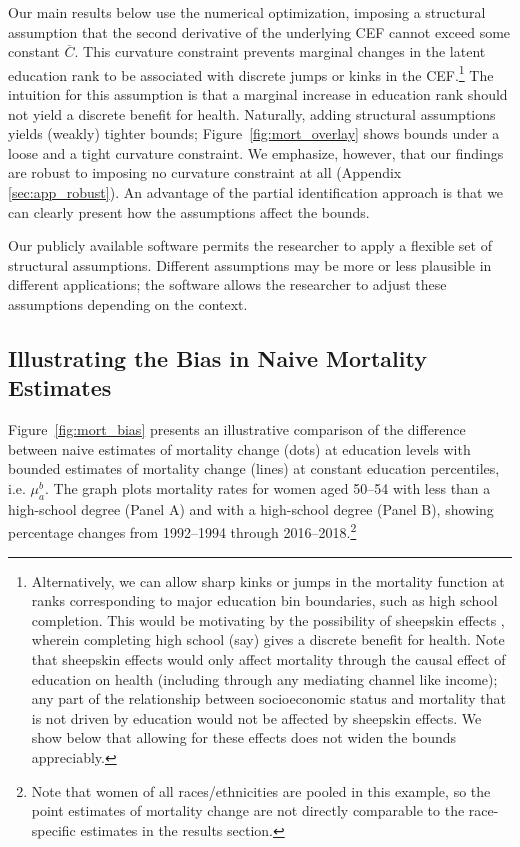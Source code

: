 \documentclass[12pt,letterpaper]{article}
\numberwithin{equation}{section}
\begin{document}
Our main results below use the numerical optimization, imposing a structural assumption that the second derivative of the underlying CEF cannot exceed some constant $\overline{C}$. This curvature constraint prevents marginal changes in the latent education rank to be associated with discrete jumps or kinks in the CEF.\footnote{Alternatively, we can allow sharp kinks or jumps in the mortality function at ranks corresponding to major education bin boundaries, such as high school completion. This would be motivating by the possibility of sheepskin effects \citep{hungerford1987}, wherein completing high school (say) gives a discrete benefit for health. Note that sheepskin effects would only affect mortality through the causal effect of education on health (including through any mediating channel like income); any part of the relationship between socioeconomic status and mortality that is not driven by education would not be affected by sheepskin effects. We show below that allowing for these effects does not widen the bounds appreciably.}  The intuition for this assumption is that a marginal increase in education rank should not yield a discrete benefit for health. Naturally, adding structural assumptions yields (weakly) tighter bounds; Figure~\ref{fig:mort_overlay} shows bounds under a loose and a tight curvature constraint. We emphasize, however, that our findings are robust to imposing no curvature constraint at all (Appendix \ref{sec:app_robust}). An advantage of the partial identification approach is that we can clearly present how the assumptions affect the bounds.

Our publicly available software permits the researcher to apply a flexible set of structural assumptions. Different assumptions may be more or less plausible in different applications; the software allows the researcher to adjust these assumptions depending on the context.

\subsection{Illustrating the Bias in Naive Mortality Estimates} 
\label{sec:bias}

Figure~\ref{fig:mort_bias} presents an illustrative comparison of the difference between naive estimates of mortality change (dots) at education levels with bounded estimates of mortality change (lines) at constant education percentiles, i.e. $\mu_a^b$. The graph plots mortality rates for women aged 50--54 with less than a high-school degree (Panel A) and with a high-school degree (Panel B), showing percentage changes from 1992--1994 through 2016--2018.\footnote{Note that women of all races/ethnicities are pooled in this example, so the point estimates of mortality change are not directly comparable to the race-specific estimates in the results section.} 
\end{document}
